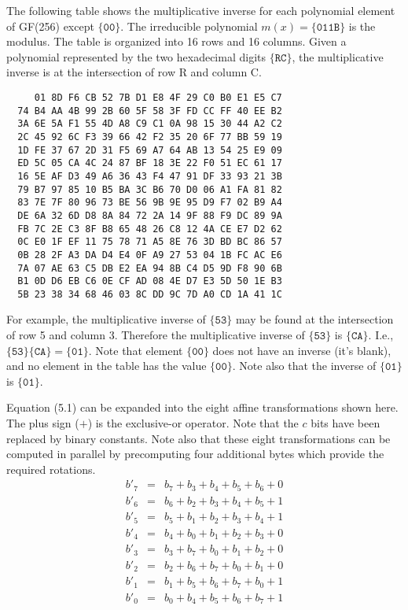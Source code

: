 \documentclass{article}
\begin{document}
The following table shows the multiplicative inverse
for each polynomial element of GF(256) except $\{\mathtt{00}\}$.
The irreducible polynomial $m(x) = \{\mathtt{011B}\}$ is the modulus.
The table is organized into 16 rows and 16 columns.
Given a polynomial represented by the two hexadecimal digits $\{\mathtt{RC}\}$,
the multiplicative inverse is at the intersection of row R and column C.
\begin{verbatim}
     01 8D F6 CB 52 7B D1 E8 4F 29 C0 B0 E1 E5 C7
  74 B4 AA 4B 99 2B 60 5F 58 3F FD CC FF 40 EE B2
  3A 6E 5A F1 55 4D A8 C9 C1 0A 98 15 30 44 A2 C2
  2C 45 92 6C F3 39 66 42 F2 35 20 6F 77 BB 59 19
  1D FE 37 67 2D 31 F5 69 A7 64 AB 13 54 25 E9 09
  ED 5C 05 CA 4C 24 87 BF 18 3E 22 F0 51 EC 61 17
  16 5E AF D3 49 A6 36 43 F4 47 91 DF 33 93 21 3B
  79 B7 97 85 10 B5 BA 3C B6 70 D0 06 A1 FA 81 82
  83 7E 7F 80 96 73 BE 56 9B 9E 95 D9 F7 02 B9 A4
  DE 6A 32 6D D8 8A 84 72 2A 14 9F 88 F9 DC 89 9A
  FB 7C 2E C3 8F B8 65 48 26 C8 12 4A CE E7 D2 62
  0C E0 1F EF 11 75 78 71 A5 8E 76 3D BD BC 86 57
  0B 28 2F A3 DA D4 E4 0F A9 27 53 04 1B FC AC E6
  7A 07 AE 63 C5 DB E2 EA 94 8B C4 D5 9D F8 90 6B
  B1 0D D6 EB C6 0E CF AD 08 4E D7 E3 5D 50 1E B3
  5B 23 38 34 68 46 03 8C DD 9C 7D A0 CD 1A 41 1C
\end{verbatim}

For example, the multiplicative inverse of $\{\mathtt{53}\}$
may be found at the intersection of row 5 and column 3.
Therefore the multiplicative inverse of $\{\mathtt{53}\}$ is $\{\mathtt{CA}\}$.
I.e., $\{\mathtt{53}\} \{\mathtt{CA}\} = \{\mathtt{01}\}$.
Note that element $\{\mathtt{00}\}$ does not have an inverse (it's blank),
and no element in the table has the value $\{\mathtt{00}\}$.
Note also that the inverse of $\{\mathtt{01}\}$ is $\{\mathtt{01}\}$.

\newpage
Equation (5.1) can be expanded into the eight 
affine transformations shown here.
The plus sign ($+$) is the exclusive-or operator.
Note that the $c$ bits have been replaced by binary constants.
Note also that these eight transformations can be
computed in parallel by precomputing four additional 
bytes which provide the required rotations.
\begin{eqnarray*}
  b'_7 &=& b_7 + b_3 + b_4 + b_5 + b_6 + 0 \\
  b'_6 &=& b_6 + b_2 + b_3 + b_4 + b_5 + 1 \\
  b'_5 &=& b_5 + b_1 + b_2 + b_3 + b_4 + 1 \\
  b'_4 &=& b_4 + b_0 + b_1 + b_2 + b_3 + 0 \\
  b'_3 &=& b_3 + b_7 + b_0 + b_1 + b_2 + 0 \\
  b'_2 &=& b_2 + b_6 + b_7 + b_0 + b_1 + 0 \\
  b'_1 &=& b_1 + b_5 + b_6 + b_7 + b_0 + 1 \\
  b'_0 &=& b_0 + b_4 + b_5 + b_6 + b_7 + 1
\end{eqnarray*}
\end{document}
